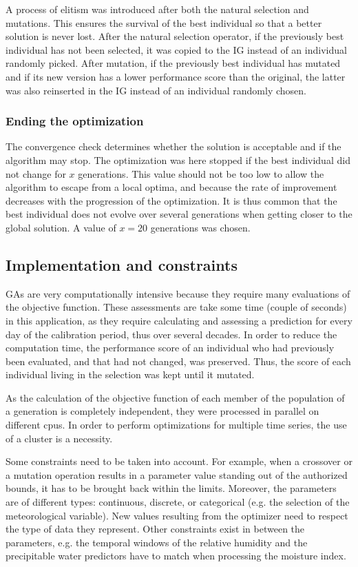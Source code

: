 \documentclass{ametsoc}
\begin{document}
A process of elitism was introduced after both the natural selection and mutations. This ensures the survival of the best individual so that a better solution is never lost. After the natural selection operator, if the previously best individual has not been selected, it was copied to the IG instead of an individual randomly picked. After mutation, if the previously best individual has mutated and if its new version has a lower performance score than the original, the latter was also reinserted in the IG instead of an individual randomly chosen.


\subsubsection{Ending the optimization}

The convergence check determines whether the solution is acceptable and if the algorithm may stop. The optimization was here stopped if the best individual did not change for $x$ generations. This value should not be too low to allow the algorithm to escape from a local optima, and because the rate of improvement decreases with the progression of the optimization. It is thus common that the best individual does not evolve over several generations when getting closer to the global solution. A value of $x=20$ generations was chosen.


\subsection{Implementation and constraints}

GAs are very computationally intensive because they require many evaluations of the objective function. These assessments are take some time (couple of seconds) in this application, as they require calculating and assessing a prediction for every day of the calibration period, thus over several decades. In order to reduce the computation time, the performance score of an individual who had previously been evaluated, and that had not changed, was preserved. Thus, the score of each individual living in the selection was kept until it mutated.

As the calculation of the objective function of each member of the population of a generation is completely independent, they were processed in parallel on different cpus. In order to perform optimizations for multiple time series, the use of a cluster is a necessity.

Some constraints need to be taken into account. For example, when a crossover or a mutation operation results in a parameter value standing out of the authorized bounds, it has to be brought back within the limits. Moreover, the parameters are of different types: continuous, discrete, or categorical (e.g. the selection of the meteorological variable). New values resulting from the optimizer need to respect the type of data they represent. Other constraints exist in between the parameters, e.g. the temporal windows of the relative humidity and the precipitable water predictors have to match when processing the moisture index.
\end{document}
